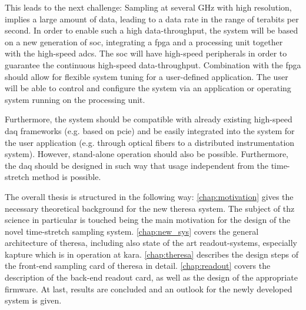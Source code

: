 This leads to the next challenge: Sampling at several \si{\GHz} with high resolution, implies a large amount of data, leading to a data rate in the range of terabits per second.
In order to enable such a high data-throughput, the system will be based on a new generation of \gls{soc}, integrating a \gls{fpga} and a processing unit together with the high-speed \glspl{adc}. 
The \gls{soc} will have high-speed peripherals in order to guarantee the continuous high-speed data-throughput. 
Combination with the \gls{fpga} should allow for flexible system tuning for a user-defined application.
The user will be able to control and configure the system via an application or operating system running on the processing unit.

Furthermore, the system should be compatible with already existing high-speed \gls{daq} frameworks (e.g. based on \gls{pcie}) and be easily integrated into the system for the user application (e.g. through optical fibers to a distributed instrumentation system). 
However, stand-alone operation should also be possible.
Furthermore, the \gls{daq} should be designed in such way that usage independent from the time-stretch method is possible.

The overall thesis is structured in the following way: 
\autoref{chap:motivation} gives the necessary theoretical background for the new \gls{theresa} system. 
The subject of \gls{thz} science in particular is touched being the main motivation for the design of the novel time-stretch sampling system.
\autoref{chap:new_sys} covers the general architecture of \gls{theresa}, including also state of the art readout-systems, especially \gls{kapture} which is in operation at \gls{kara}.
\autoref{chap:theresa} describes the design steps of the front-end sampling card of \gls{theresa} in detail.
\autoref{chap:readout} covers the description of the back-end readout card, as well as the design of the appropriate firmware.
At last, results are concluded and an outlook for the newly developed system is given.

\glsresetall